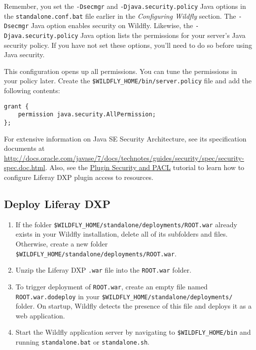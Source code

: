 Remember, you set the \texttt{-Dsecmgr} and
\texttt{-Djava.security.policy} Java options in the
\texttt{standalone.conf.bat} file earlier in the \emph{Configuring
Wildfly} section. The \texttt{-Dsecmgr} Java option enables security on
Wildfly. Likewise, the \texttt{-Djava.security.policy} Java option lists
the permissions for your server's Java security policy. If you have not
set these options, you'll need to do so before using Java security.

This configuration opens up all permissions. You can tune the
permissions in your policy later. Create the
\texttt{\$WILDFLY\_HOME/bin/server.policy} file and add the following
contents:

\begin{verbatim}
grant {
    permission java.security.AllPermission;
};
\end{verbatim}

For extensive information on Java SE Security Architecture, see its
specification documents at
\url{http://docs.oracle.com/javase/7/docs/technotes/guides/security/spec/security-spec.doc.html}.
Also, see the
\href{/docs/6-2/tutorials/-/knowledge_base/t/plugin-security-and-pacl}{Plugin
Security and PACL} tutorial to learn how to configure Liferay DXP plugin
access to resources.

\subsection{Deploy Liferay DXP}\label{deploy-liferay-dxp}

\begin{enumerate}
\def\labelenumi{\arabic{enumi}.}
\item
  If the folder \texttt{\$WILDFLY\_HOME/standalone/deployments/ROOT.war}
  already exists in your Wildfly installation, delete all of its
  subfolders and files. Otherwise, create a new folder
  \texttt{\$WILDFLY\_HOME/standalone/deployments/ROOT.war}.
\item
  Unzip the Liferay DXP \texttt{.war} file into the \texttt{ROOT.war}
  folder.
\item
  To trigger deployment of \texttt{ROOT.war}, create an empty file named
  \texttt{ROOT.war.dodeploy} in your
  \texttt{\$WILDFLY\_HOME/standalone/deployments/} folder. On startup,
  Wildfly detects the presence of this file and deploys it as a web
  application.
\item
  Start the Wildfly application server by navigating to
  \texttt{\$WILDFLY\_HOME/bin} and running \texttt{standalone.bat} or
  \texttt{standalone.sh}.
\end{enumerate}

